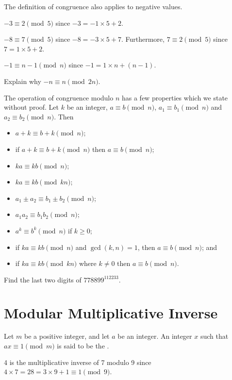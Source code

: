 The definition of congruence also applies to negative values.
\begin{example}
    $-3 \equiv 2 \pmod5$ since $-3 = -1\times5 + 2$.
\end{example}
\begin{example}
    $-8 \equiv 7 \pmod5$ since $-8 = -3\times5 + 7$. Furthermore, $7 \equiv 2 \pmod5$ since $7 = 1\times5 + 2$.
\end{example}
\begin{example}
    $-1 \equiv n-1 \pmod{n}$ since $-1 = 1\times n + (n-1)$.
\end{example}

\begin{exercise}
    Explain why $-n \equiv n \pmod{2n}$.
\end{exercise}

The operation of congruence modulo $n$ has a few properties which we state without proof. Let $k$ be an integer, $a \equiv b \pmod n$, $a_1 \equiv b_1 \pmod n$ and $a_2 \equiv b_2 \pmod n$. Then
\begin{itemize}
    \item $a + k \equiv b + k \pmod n$;
    \item if $a+k \equiv b+k \pmod n$ then $a \equiv b \pmod n$;
    \item $ka \equiv kb \pmod n$;
    \item $ka \equiv kb \pmod {kn}$;
    \item $a_1 \pm a_2 \equiv b_1 \pm b_2 \pmod n$;
    \item $a_1a_2 \equiv b_1b_2 \pmod n$;
    \item $a^k \equiv b^k \pmod n$ if $k \geq 0$;
    \item if $ka \equiv kb \pmod n$ and $\gcd(k, n) = 1$, then $a \equiv b \pmod n$; and
    \item if $ka \equiv kb \pmod{kn}$ where $k \neq 0$ then $a \equiv b \pmod n$.
\end{itemize}

\begin{exercise}
    Find the last two digits of $778899^{112233}$.
\end{exercise}

\newpage

\section{Modular Multiplicative Inverse}
\begin{definition}
    Let $m$ be a positive integer, and let $a$ be an integer. An integer $x$ such that $ax \equiv 1 \pmod m$ is said to be the .
\end{definition}
\begin{example}
    4 is the multiplicative inverse of 7 modulo 9 since $4 \times 7 = 28 = 3 \times 9 + 1 \equiv 1 \pmod 9$.
\end{example}

